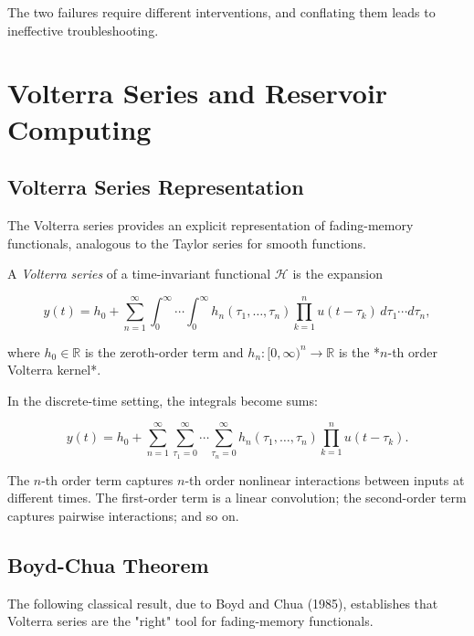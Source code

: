 The two failures require different interventions, and conflating them leads to
ineffective troubleshooting.


\bigskip


\section{Volterra Series and Reservoir Computing}\label{sec:15.5}

\subsection{Volterra Series Representation}\label{sec:15.5.1}

The Volterra series provides an explicit representation of fading-memory functionals,
analogous to the Taylor series for smooth functions.

\begin{definition}\label{def:15.13}
A \textit{Volterra series} of a time-invariant
functional $\mathcal{H}$ is the expansion

\[
y(t) = h_0 + \sum_{n=1}^{\infty} \int_0^{\infty} \cdots \int_0^{\infty} h_n(\tau_1, \ldots, \tau_n) \prod_{k=1}^n u(t - \tau_k)\, d\tau_1 \cdots d\tau_n,
\]

where $h_0 \in \mathbb{R}$ is the zeroth-order term and $h_n: [0,\infty)^n \to \mathbb{R}$
is the *$n$-th order Volterra kernel*.

In the discrete-time setting, the integrals become sums:

\[
y(t) = h_0 + \sum_{n=1}^{\infty} \sum_{\tau_1=0}^{\infty} \cdots \sum_{\tau_n=0}^{\infty} h_n(\tau_1, \ldots, \tau_n) \prod_{k=1}^n u(t - \tau_k).
\]

The $n$-th order term captures $n$-th order nonlinear interactions between inputs at
different times. The first-order term is a linear convolution; the second-order term
captures pairwise interactions; and so on.
\end{definition}


\subsection{Boyd-Chua Theorem}\label{sec:15.5.2}

The following classical result, due to Boyd and Chua (1985), establishes that Volterra
series are the "right" tool for fading-memory functionals.

